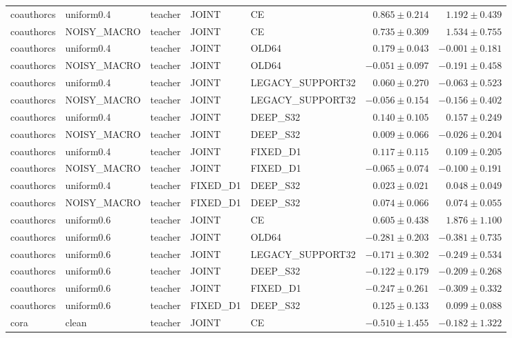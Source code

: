 \begin{longtable}{lllllrr}
coauthorcs & uniform0.4 & teacher & JOINT & CE & $0.865 \pm 0.214$ & $1.192 \pm 0.439$ \\
coauthorcs & NOISY\_MACRO & teacher & JOINT & CE & $0.735 \pm 0.309$ & $1.534 \pm 0.755$ \\
coauthorcs & uniform0.4 & teacher & JOINT & OLD64 & $0.179 \pm 0.043$ & $-0.001 \pm 0.181$ \\
coauthorcs & NOISY\_MACRO & teacher & JOINT & OLD64 & $-0.051 \pm 0.097$ & $-0.191 \pm 0.458$ \\
coauthorcs & uniform0.4 & teacher & JOINT & LEGACY\_SUPPORT32 & $0.060 \pm 0.270$ & $-0.063 \pm 0.523$ \\
coauthorcs & NOISY\_MACRO & teacher & JOINT & LEGACY\_SUPPORT32 & $-0.056 \pm 0.154$ & $-0.156 \pm 0.402$ \\
coauthorcs & uniform0.4 & teacher & JOINT & DEEP\_S32 & $0.140 \pm 0.105$ & $0.157 \pm 0.249$ \\
coauthorcs & NOISY\_MACRO & teacher & JOINT & DEEP\_S32 & $0.009 \pm 0.066$ & $-0.026 \pm 0.204$ \\
coauthorcs & uniform0.4 & teacher & JOINT & FIXED\_D1 & $0.117 \pm 0.115$ & $0.109 \pm 0.205$ \\
coauthorcs & NOISY\_MACRO & teacher & JOINT & FIXED\_D1 & $-0.065 \pm 0.074$ & $-0.100 \pm 0.191$ \\
coauthorcs & uniform0.4 & teacher & FIXED\_D1 & DEEP\_S32 & $0.023 \pm 0.021$ & $0.048 \pm 0.049$ \\
coauthorcs & NOISY\_MACRO & teacher & FIXED\_D1 & DEEP\_S32 & $0.074 \pm 0.066$ & $0.074 \pm 0.055$ \\
coauthorcs & uniform0.6 & teacher & JOINT & CE & $0.605 \pm 0.438$ & $1.876 \pm 1.100$ \\
coauthorcs & uniform0.6 & teacher & JOINT & OLD64 & $-0.281 \pm 0.203$ & $-0.381 \pm 0.735$ \\
coauthorcs & uniform0.6 & teacher & JOINT & LEGACY\_SUPPORT32 & $-0.171 \pm 0.302$ & $-0.249 \pm 0.534$ \\
coauthorcs & uniform0.6 & teacher & JOINT & DEEP\_S32 & $-0.122 \pm 0.179$ & $-0.209 \pm 0.268$ \\
coauthorcs & uniform0.6 & teacher & JOINT & FIXED\_D1 & $-0.247 \pm 0.261$ & $-0.309 \pm 0.332$ \\
coauthorcs & uniform0.6 & teacher & FIXED\_D1 & DEEP\_S32 & $0.125 \pm 0.133$ & $0.099 \pm 0.088$ \\
cora & clean & teacher & JOINT & CE & $-0.510 \pm 1.455$ & $-0.182 \pm 1.322$ \\

\end{longtable}
